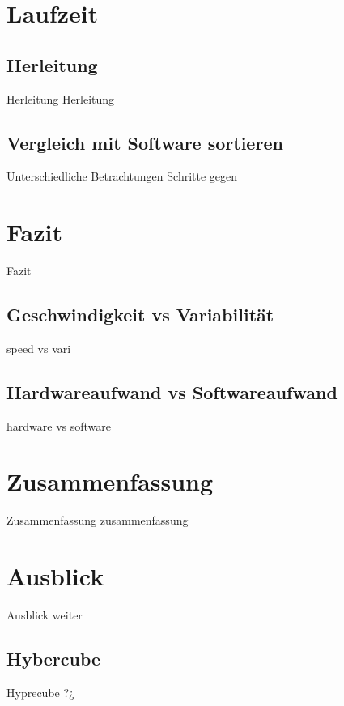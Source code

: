 \documentclass[ucs,9pt]{beamer}
\begin{document}
\section{Laufzeit}
\subsection{Herleitung}
\begin{frame}{Herleitung}
Herleitung
\end{frame}
\subsection{Vergleich mit Software sortieren}
\begin{frame}
Unterschiedliche Betrachtungen Schritte gegen 
\end{frame}
\section{Fazit}
\begin{frame}
Fazit
\end{frame}
\subsection{Geschwindigkeit vs Variabilität}
\begin{frame}
speed vs vari
\end{frame}
\subsection{Hardwareaufwand vs Softwareaufwand}
\begin{frame}
hardware vs software
\end{frame}

\section{Zusammenfassung}
\begin{frame}{Zusammenfassung}
zusammenfassung
\end{frame}
\section{Ausblick}
\begin{frame}{Ausblick}
weiter
\end{frame}
\subsection{Hybercube}
\begin{frame}{Hyprecube}
?¿
\end{frame}
\end{document}
